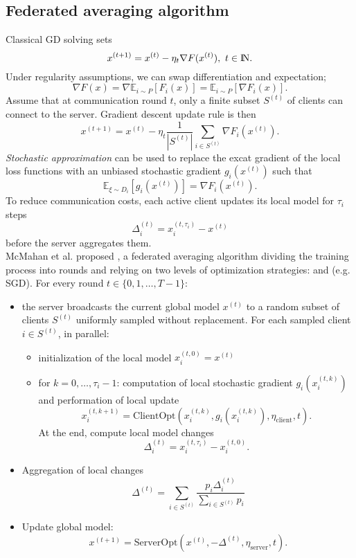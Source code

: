 \documentclass[10pt,a4paper]{book}
\theoremstyle{definition}
\theoremstyle{plain}
\theoremstyle{remark}
\newcommand \Esp {\mathbb{E}}
\def\N{{\rm I\kern-0.16em N}}
\begin{document}
\subsection{Federated averaging algorithm}Classical GD solving sets
$$x^{(t+1)}=x^{(t)}-\eta_t\nabla F(x^{(t)}),~t\in \N.$$
Under regularity assumptions, we can swap differentiation and expectation;
$$\nabla F(x)=\nabla \Esp_{i\sim P}[F_i(x)]=\Esp_{i\sim P}[\nabla F_i(x)].$$
Assume that at communication round $t$, only a finite subset $S^{(t)}$ of clients can connect to the server. Gradient descent update rule is then
$$x^{(t+1)}=x^{(t)}-\eta_t \frac{1}{|S^{(t)}|}\sum_{i\in S^{(t)}}\nabla F_i(x^{(t)}).$$
\emph{Stochastic approximation} can be used to replace the excat gradient of the local loss functions with an unbiased stochastic gradient $g_i(x^{(t)})$ such that
$$\Esp_{\xi \sim D_i}[g_i(x^{(t)})]=\nabla F_i(x^{(t)}).$$
To reduce communication costs, each active client updates its local model for $\tau_i$ steps 
$$\Delta_i^{(t)}=x_i^{(t,\tau_i)}-x^{(t)}$$
before the server aggregates them.\\
McMahan et al. proposed , a federated averaging algorithm dividing the training process into rounds and relying on two levels of optimization strategies:  and  (e.g. SGD). For every round $t\in \{0,1,\dots, T-1\}$:
\begin{itemize}
\item the server broadcasts the current global model $x^{(t)}$ to a random subset of clients $S^{(t)}$ uniformly sampled without replacement. For each sampled client $i\in S^{(t)}$, in parallel:
\begin{itemize}
\item initialization of the local model $x_i^{(t,0)}=x^{(t)}$
\item for $k=0,\dots, \tau_i-1$: computation of local stochastic gradient $g_i(x_i^{(t,k)})$ and performation of local update
$$x_i^{(t,k+1)}=\text{ClientOpt}(x_i^{(t,k)},g_i(x_i^{(t,k)}),\eta_{\text{client}},t).$$
At the end, compute local model changes
$$\Delta_i^{(t)}=x_i^{(t,\tau_i)}-x_i^{(t,0)}.$$
\end{itemize}
\item Aggregation of local changes
$$\Delta^{(t)}=\sum_{i\in S^{(t)}}\frac{p_i \Delta_i^{(t)}}{\sum_{i\in S^{(t)}}p_i}$$
\item Update global model: $$x^{(t+1)}=\text{ServerOpt}(x^{(t)},-\Delta^{(t)},\eta_{\text{server}},t).$$
\end{itemize}
\end{document}
